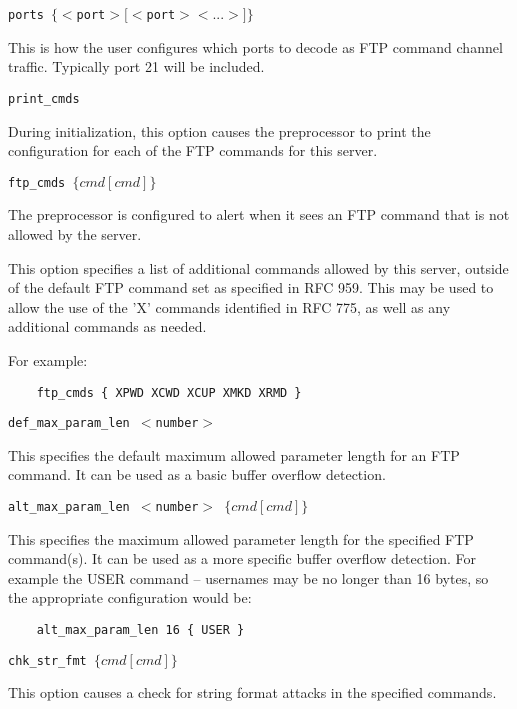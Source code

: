 \documentclass[english]{report}
\newcounter{slistnum}
\newenvironment{slist}
{ \begin{list}{ {\bf \arabic{slistnum}.} }{\usecounter{slistnum} } }
{ \end{list} }
\begin{document}
\begin{slist}
\item \texttt{ports $\{ <$port$> [<$port$> <...>] \}$}

This is how the user configures which ports to decode as FTP command channel
traffic.  Typically port 21 will be included.

\item \texttt{print\_cmds}

During initialization, this option causes the preprocessor to print the
configuration for each of the FTP commands for this server.  

\item \texttt{ftp\_cmds $\{ cmd [cmd] \}$ }

The preprocessor is configured to alert when it sees an FTP command that is not
allowed by the server.

This option specifies a list of additional commands allowed by this server,
outside of the default FTP command set as specified in RFC 959.  This may be
used to allow the use of the 'X' commands identified in RFC 775, as well as any
additional commands as needed.

For example:

\begin{verbatim}
    ftp_cmds { XPWD XCWD XCUP XMKD XRMD }
\end{verbatim}

\item \texttt{def\_max\_param\_len $<$number$>$}

This specifies the default maximum allowed parameter length for an FTP command.
It can be used as a basic buffer overflow detection.

\item \texttt{alt\_max\_param\_len $<$number$>$ $\{ cmd [cmd] \}$}

This specifies the maximum allowed parameter length for the specified FTP
command(s).  It can be used as a more specific buffer overflow detection.  For
example the USER command -- usernames may be no longer than 16 bytes, so the
appropriate configuration would be:

\begin{verbatim}
    alt_max_param_len 16 { USER }
\end{verbatim}

\item \texttt{chk\_str\_fmt $\{ cmd [cmd] \}$}

This option causes a check for string format attacks in the specified commands. 


\end{slist}
\end{document}
